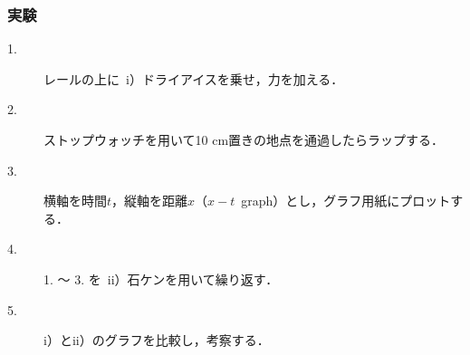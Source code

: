 \documentclass[11pt]{beamer}
\begin{document}
\begin{frame}[containsverbatim]
\frametitle{実験}

\begin{description}
  \item[1. ] レールの上に\ i）ドライアイスを乗せ，力を加える．
  \item[2. ] ストップウォッチを用いて10 cm置きの地点を通過したらラップする．
  \item[3. ] 横軸を時間$t$，縦軸を距離$x$（$x-t$\ graph）とし，グラフ用紙にプロットする．
  \item[4. ] 1. ～ 3. を\ ii）石ケンを用いて繰り返す．
  \item[5. ] i）とii）のグラフを比較し，考察する．
\end{description}

\end{frame}
\end{document}
